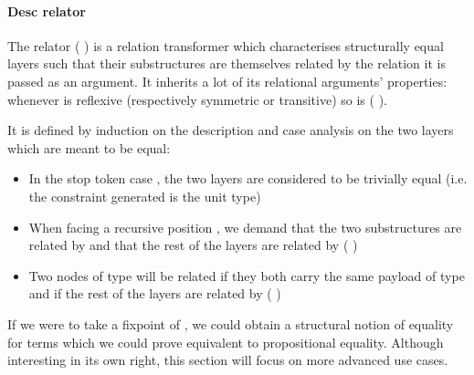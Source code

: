 \begin{agdasnippet}
\end{agdasnippet}

\paragraph*{Desc relator}
The relator (  ) is a relation transformer which characterises
structurally equal layers such that their substructures are themselves related
by the relation it is passed as an argument. It inherits a lot of its relational
arguments' properties: whenever  is reflexive (respectively symmetric or
transitive) so is {(   )}.\label{lem:zipstable}

It is defined by induction on the description and case analysis on the two
layers which are meant to be equal:
\begin{itemize}
  \item In the stop token case  , the two layers are considered to
    be trivially equal (i.e. the constraint generated is the unit type)
  \item When facing a recursive position { \AB{$\Delta$}  }, we
    demand that the two substructures are related by { \AB{$\Delta$} }
    and that the rest of the layers are related by (   )
  \item Two nodes of type {  } will
    be related if they both carry the same payload  of type  and if
    the rest of the layers are related by (    )
\end{itemize}

\begin{agdasnippet}
\end{agdasnippet}

If we were to take a fixpoint of , we could obtain a structural
notion of equality for terms which we could prove equivalent to propositional
equality. Although interesting in its own right, this section will focus
on more advanced use cases.



